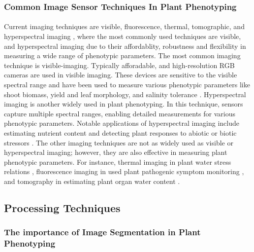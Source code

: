 \subsubsection{Common Image Sensor Techniques In Plant Phenotyping}
\paragraph{}
Current imaging techniques are visible, fluorescence, thermal, tomographic, and hyperspectral imaging \cite{qiuSensorsMeasuringPlant2018, liReviewImagingTechniques2014}, where the most commonly used techniques are visible, and hyperspectral imaging due to their affordablity, robustness and flexibility in measuring a wide range of phenotypic parameters. The most common imaging technique is visible-imaging. Typically afforadable, and high-resolution RGB cameras are used in visible imaging. These devices are sensitive to the visible spectral range and have been used to measure various phenotypic parameters like shoot biomass, yield and leaf morphology, and salinity tolerance \cite{golzarianAccurateInferenceShoot2011, hoyos-villegasGroundBasedDigitalImaging2014}. Hyperspectral imaging is another widely used in plant phenotyping. In this technique, sensors capture multiple spectral ranges, enabling detailed measurements for various phenotypic parameters. Notable applications of hyperspectral imaging include estimating nutrient content and detecting plant responses to abiotic or biotic stressors \cite{saricApplicationsHyperspectralImaging2022}. The other imaging techniques are not as widely used as visible or hyperspectral imaging; however, they are also effective in measuring plant phenotypic parameters. For instance, thermal imaging in plant water stress relations \cite{liReviewImagingTechniques2014, ishimweApplicationsThermalImaging2014}, fluorescence imaging in used plant pathogenic symptom monitoring \cite{lichtenthalerRoleChlorophyllFluorescence1988, swarbrickMetabolicConsequencesSusceptibility2006}, and tomography in estimating plant organ water content \cite{windtMRILongdistanceWater2006}.

\subsection{Processing Techniques}

\subsubsection{The importance of Image Segmentation in Plant Phenotyping}
